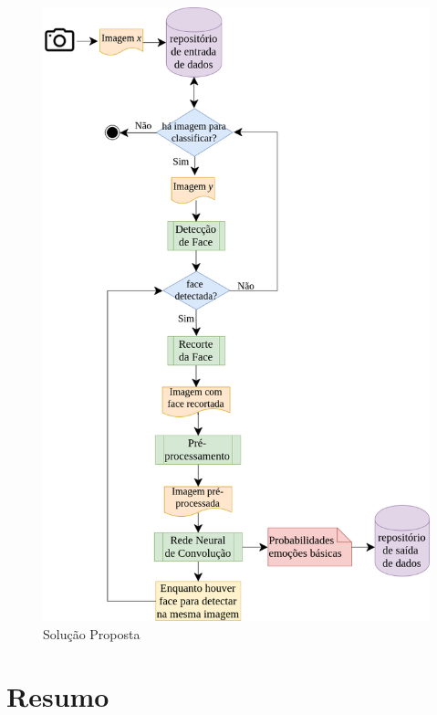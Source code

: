 \begin{figure}
\centering
\includegraphics[scale=0.45]{figuras/arquitetura.png}
\caption{Solução Proposta}
\label{fig:arquitetura2}
\end{figure}

     

\section{Resumo}\label{sec:considfi}
